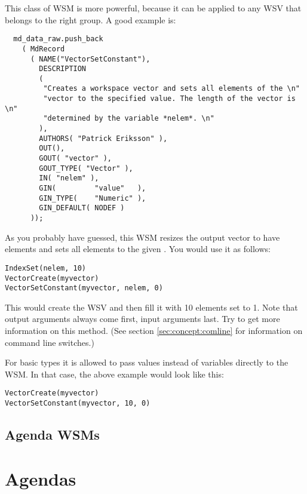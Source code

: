 This class of WSM is more powerful, because it can be applied to any
WSV that belongs to the right group. A good example is:

{\small
\begin{verbatim}
  md_data_raw.push_back
    ( MdRecord
      ( NAME("VectorSetConstant"),
        DESCRIPTION
        (
         "Creates a workspace vector and sets all elements of the \n"
         "vector to the specified value. The length of the vector is \n"
         "determined by the variable *nelem*. \n"
        ),
        AUTHORS( "Patrick Eriksson" ),
        OUT(),
        GOUT( "vector" ),
        GOUT_TYPE( "Vector" ),
        IN( "nelem" ),
        GIN(         "value"   ),
        GIN_TYPE(    "Numeric" ),
        GIN_DEFAULT( NODEF )
      ));
\end{verbatim}
}

\noindent
As you probably have guessed, this WSM resizes the output vector to have  elements and sets all elements to the given .
You would use it as follows:

{\small
\begin{verbatim}
IndexSet(nelem, 10)
VectorCreate(myvector)
VectorSetConstant(myvector, nelem, 0)
\end{verbatim}
}

\noindent
This would create the WSV  and then fill it with 10
elements set to 1. Note that output arguments always come first, input
arguments last. Try  to
get more information on this method. (See section \ref{sec:concept:comline}
for information on command line switches.)

\noindent
For basic types it is allowed to pass values instead of variables directly to
the WSM. In that case, the above example would look like this:

{\small
\begin{verbatim}
VectorCreate(myvector)
VectorSetConstant(myvector, 10, 0)
\end{verbatim}
}


\subsection{Agenda WSMs}

\section{Agendas}
\label{sec:agendas:agendas}

